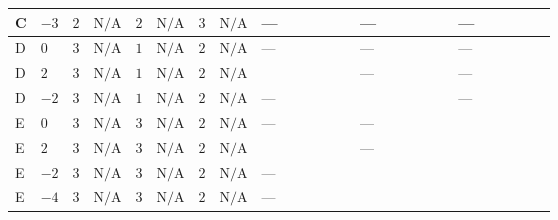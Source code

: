\documentclass[8pt]{article}
\begin{document}
\begin{landscape}
\begin{longtable}{@{}llcccccc >{\raggedright\arraybackslash}p{0.21\linewidth} >{\raggedright\arraybackslash}p{0.21\linewidth} >{\raggedright\arraybackslash}p{0.21\linewidth}@{}}
\midrule
C & $-3$ & $2$ & $\text{N/A}$ & $2$ & $\text{N/A}$ & $3$ & $\text{N/A}$ & --- & --- & --- \\
\midrule
D & $0$ & $3$ & $\text{N/A}$ & $1$ & $\text{N/A}$ & $2$ & $\text{N/A}$ & --- & --- & --- \\
\midrule
D & $2$ & $3$ & $\text{N/A}$ & $1$ & $\text{N/A}$ & $2$ & $\text{N/A}$ & \scriptsize\adjustbox{max width=\linewidth}{$\begin{gathered} +{g_1}^2 \left(4 {g_2}^2-\frac{15 {\lambda_{HS_1}^{(A)}}}{2}\right)\end{gathered}$} & --- & --- \\
\midrule
D & $-2$ & $3$ & $\text{N/A}$ & $1$ & $\text{N/A}$ & $2$ & $\text{N/A}$ & --- & \scriptsize\adjustbox{max width=\linewidth}{$\begin{gathered} +{g_1}^2 \left(-4 {g_2}^2-\frac{15 {\lambda_{HS_1}^{(A)}}}{2}\right)\end{gathered}$} & --- \\
\midrule
E & $0$ & $3$ & $\text{N/A}$ & $3$ & $\text{N/A}$ & $2$ & $\text{N/A}$ & --- & --- & \scriptsize\adjustbox{max width=\linewidth}{$\begin{gathered} +12 {\lambda_{12}^{(A)}} {\lambda_{HS_2}^{(A)}}\end{gathered}$} \\
\midrule
E & $2$ & $3$ & $\text{N/A}$ & $3$ & $\text{N/A}$ & $2$ & $\text{N/A}$ & \scriptsize\adjustbox{max width=\linewidth}{$\begin{gathered} +{g_1}^2 \left(4 {g_2}^2-\frac{15 {\lambda_{HS_1}^{(A)}}}{2}\right)\end{gathered}$} & --- & \scriptsize\adjustbox{max width=\linewidth}{$\begin{gathered} +12 {\lambda_{12}^{(A)}} {\lambda_{HS_2}^{(A)}}\end{gathered}$} \\
\midrule
E & $-2$ & $3$ & $\text{N/A}$ & $3$ & $\text{N/A}$ & $2$ & $\text{N/A}$ & --- & \scriptsize\adjustbox{max width=\linewidth}{$\begin{gathered} +{g_1}^2 \left(-4 {g_2}^2-\frac{15 {\lambda_{HS_1}^{(A)}}}{2}\right)\end{gathered}$} & \scriptsize\adjustbox{max width=\linewidth}{$\begin{gathered} +12 {\lambda_{12}^{(A)}} {\lambda_{HS_2}^{(A)}}\end{gathered}$} \\
\midrule
E & $-4$ & $3$ & $\text{N/A}$ & $3$ & $\text{N/A}$ & $2$ & $\text{N/A}$ & --- & \scriptsize\adjustbox{max width=\linewidth}{$\begin{gathered} +{g_1}^2 \left(-8 {g_2}^2-\frac{51 {\lambda_{HS_1}^{(A)}}}{2}\right)\end{gathered}$} & \scriptsize\adjustbox{max width=\linewidth}{$\begin{gathered} +12 {\lambda_{12}^{(A)}} {\lambda_{HS_2}^{(A)}}\end{gathered}$} \\
\midrule
\bottomrule
\end{longtable}
\clearpage

\end{landscape}
\end{document}
